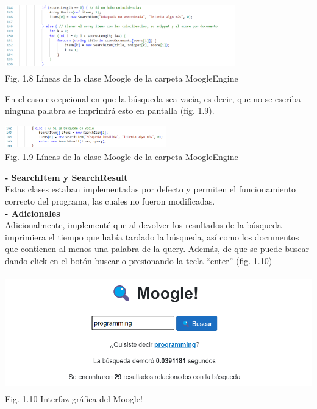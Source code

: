 \documentclass[letterpaper]{article}
\begin{document}
{\begin{center}
	\includegraphics[width=10cm, height=3cm]{fig 1.8.png}\\
	{\tiny Fig. 1.8 Líneas de la clase Moogle de la carpeta MoogleEngine}\\
\end{center}

En el caso excepcional en que la búsqueda sea vacía, es decir, que no se escriba ninguna
palabra se imprimirá esto en pantalla (fig. 1.9).

\begin{center}
	\includegraphics[width=7cm, height=1cm]{fig 1.9.png}\\
	{\tiny Fig. 1.9 Líneas de la clase Moogle de la carpeta MoogleEngine}
\end{center}

\textbf{{\large- SearchItem y SearchResult}}\\
Estas clases estaban implementadas por defecto y permiten el funcionamiento correcto del
programa, las cuales no fueron modificadas. \\

\textbf{{\large- Adicionales}}\\

Adicionalmente, implementé que al devolver los resultados de la búsqueda imprimiera el
tiempo que había tardado la búsqueda, así como los documentos que contienen al menos
una palabra de la query. Además, de que se puede buscar dando click en el botón buscar o
presionando la tecla “enter” (fig. 1.10)
}
\begin{center}
	\includegraphics[width=15cm, height=5cm]{fig 1.10.png}\\
	{\tiny Fig. 1.10 Interfaz gráfica del Moogle!}
\end{center}
\end{document}

